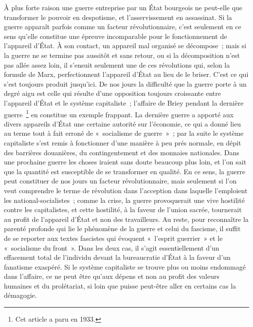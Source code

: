 \documentclass[french,twoside]{book} %
\begin{document}
À plus forte raison une guerre entreprise par un État bourgeois ne peut-elle que transformer le pouvoir en despotisme, et l'asservissement en assassinat. Si la guerre apparaît parfois comme un facteur révolutionnaire, c'est seulement en ce sens qu'elle constitue une épreuve incomparable pour le fonctionnement de l'appareil d'État. À son contact, un appareil mal organisé se décompose ; mais si la guerre ne se termine pas aussitôt et sans retour, ou si la décompo­sition n'est pas allée assez loin, il s'ensuit seulement une de ces révolutions qui, selon la formule de Marx, perfectionnent l'appareil d'État au lieu de le briser. C'est ce qui s'est toujours produit jusqu'ici. De nos jours la difficulté que la guerre porte à un degré aigu est celle qui résulte d'une opposition toujours croissante entre l'appareil d'État et le système capitaliste ; l'affaire de Briey pendant la dernière guerre \footnote{Cet article a paru en 1933.} en constitue un exemple frappant. La dernière guerre a apporté aux divers appareils d'État une certaine autorité sur l'économie, ce qui a donné lieu au terme tout à fait erroné de « socialisme de guerre » ; par la suite le système capitaliste s'est remis à fonctionner d'une manière à peu prés normale, en dépit des barrières douanières, du contingen­tement et des monnaies nationales. Dans une prochaine guerre les choses iraient sans doute beaucoup plus loin, et l'on sait que la quantité est suscepti­ble de se transformer en qualité. En ce sens, la guerre peut constituer de nos jours un facteur révolutionnaire, mais seulement si l'on veut comprendre le terme de révolution dans l'acception dans laquelle l'emploient les national-socialistes ; comme la crise, la guerre provoquerait une vive hostilité contre les capitalistes, et cette hostilité, à la faveur de l'union sacrée, tournerait au profit de l'appareil d'État et non des travailleurs. Au reste, pour reconnaître la parenté profonde qui lie le phénomène de la guerre et celui du fascisme, il suffit de se reporter aux textes fascistes qui évoquent « l'esprit guerrier » et le « socialisme du front ». Dans les deux cas, il s'agit essentiellement d'un effacement total de l'individu devant la bureaucratie d'État à la faveur d'un fanatisme exaspéré. Si le système capitaliste se trouve plus ou moins endom­magé dans l'affaire, ce ne peut être qu'aux dépens et non au profit des valeurs humaines et du prolétariat, si loin que puisse peut-être aller en certains cas la démagogie.\par
\end{document}
